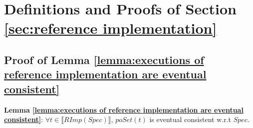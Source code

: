 
\section{Definitions and Proofs of Section \ref{sec:reference implementation}}
\label{sec:appendix definitions and proofs of section reference implementation}



\subsection{Proof of Lemma \ref{lemma:executions of reference implementation are eventual consistent}}
\label{subsec:appendix proof of lemma executions of reference implementation are eventual consistent}

{\noindent \bf Lemma \ref{lemma:executions of reference implementation are eventual consistent}}: $\forall t \in \llbracket RImp(Spec) \rrbracket$, $poSet(t)$ is eventual consistent w.r.t $Spec$.

